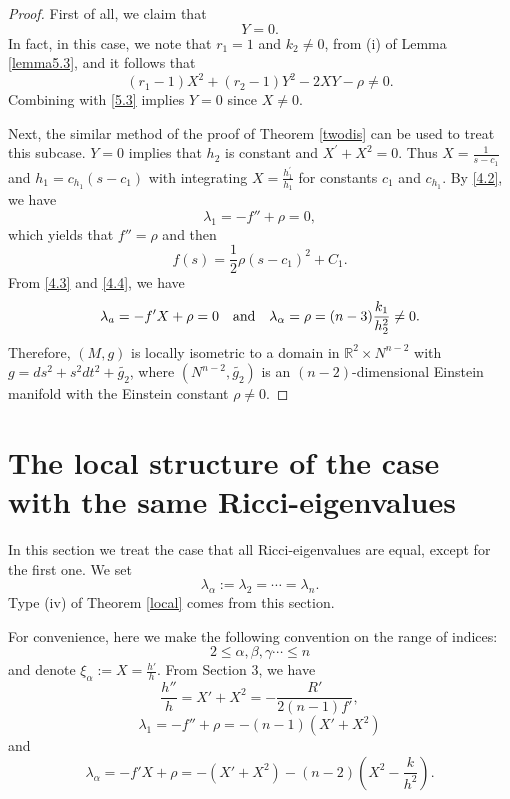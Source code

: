 \documentclass{amsart}
\theoremstyle{definition}
\theoremstyle{remark}
\numberwithin{equation}{section}
\begin{document}
\begin{proof} 
First of all, we claim that 
\[
Y=0.
\]
In fact, in this case, we note that $r_1=1$ and $k_2\neq0$,
from (i) of Lemma \ref{lemma5.3}, and it follows that
	\[
	(r_1-1)X^2+(r_2-1)Y^2-2XY-\rho \neq 0.
\]
Combining with \eqref{5.3} implies $Y=0$ since $X\neq0$.

Next, the similar method of the proof of Theorem \ref{twodis} can be used to treat
this subcase. 
	$Y=0$ implies that $h_2$ is constant and $X^{'} + X^2=0$. Thus $X= \frac{1}{s-c_1}$ and 
	$h_1= c_{h_1} (s-c_1)$ with integrating $X= \frac{h^{'}_1}{h_1}$ for constants $c_1$ and $c_{h_1}$.
	By \eqref{4.2}, we have
	\[
	\lambda_1=-f''+\rho=0,
	\]
	which yields that $f''=\rho$ and then
	\[
	f(s) = \frac{1}{2} \rho (s-c_1)^2+C_1.
	\]
From \eqref{4.3} and \eqref{4.4}, we have 
	\[
		\lambda_a=-f'X+\rho=0 \quad {\rm and } \quad
	\lambda_\alpha=\rho=(n-3)\frac{k_1}{h^2_2}\neq0.
	\]
	Therefore, $(M,g)$ is locally isometric to a domain in 
	$\mathbb{R}^{2}\times N^{n-2}$
	with $g= ds^2 + s^2dt^2+\tilde{g_2}$,
	where $\left(N^{n-2}, \tilde{g_2}\right)$ 
	is an $(n-2)$-dimensional Einstein manifold
	with the Einstein constant $\rho\neq 0$.	
\end{proof}

	\section
	{The local structure of the case with the same Ricci-eigenvalues}
	
	In this section we treat the case that all Ricci-eigenvalues are equal, except for the first one.
	We set
	\[
	\lambda_{\alpha}:=\lambda_{2}= \cdots= \lambda_{n}.
	\]
	Type {\rm (iv)} of Theorem \ref{local} comes from this section.
	
	\smallskip
	For convenience, here we make the following convention on the range of indices:
	\[
	2 \leq \alpha, \beta, \gamma \cdots\leq n\]
	and denote $\xi_\alpha:=X=\frac{h'}{h}$.
	From Section 3, we have
	\begin{equation}\label{6.1}
	\frac{h''}{h}=X'+X^2=-\frac{R'}{2(n-1)f'},
	\end{equation}
	\begin{equation}\label{6.2}
	\lambda_{1}=-f''+\rho=-(n-1)\left( X'+X^2 \right)
	\end{equation}
	and
	\begin{equation}\label{6.3}
	\lambda_{\alpha}=-f'X+\rho=-\left( X'+X^2 \right)-(n-2)\left( X^2-\frac{k}{h^2} \right). 
	\end{equation}
	
\end{document}

